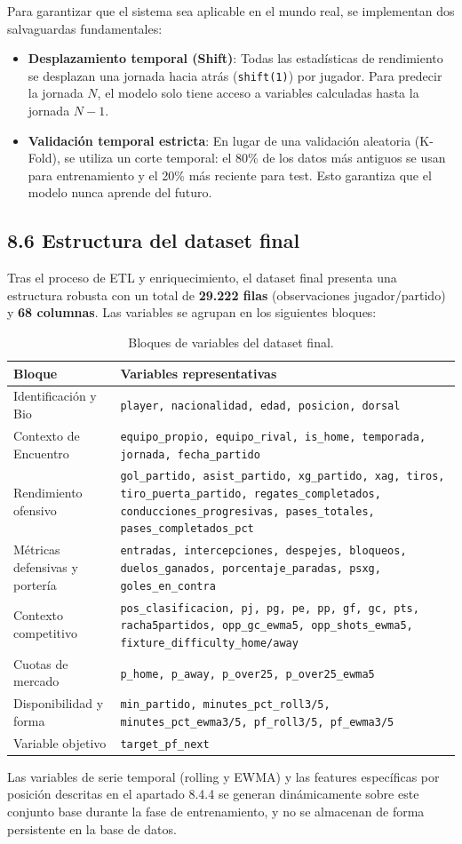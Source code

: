 Para garantizar que el sistema sea aplicable en el mundo real, se implementan dos
salvaguardas fundamentales:
 
\begin{itemize}
    \item \textbf{Desplazamiento temporal (Shift)}: Todas las estadísticas de rendimiento
    se desplazan una jornada hacia atrás (\texttt{shift(1)}) por jugador. Para predecir
    la jornada $N$, el modelo solo tiene acceso a variables calculadas hasta la jornada
    $N-1$.
 
    \item \textbf{Validación temporal estricta}: En lugar de una validación aleatoria
    (K-Fold), se utiliza un corte temporal: el 80\% de los datos más antiguos se usan
    para entrenamiento y el 20\% más reciente para test. Esto garantiza que el modelo
    nunca aprende del futuro.
\end{itemize}
 
\subsection{8.6 Estructura del dataset final}
 
Tras el proceso de ETL y enriquecimiento, el dataset final presenta una estructura robusta
con un total de \textbf{29.222 filas} (observaciones jugador/partido) y \textbf{68 columnas}.
Las variables se agrupan en los siguientes bloques:
 
\begin{table}[H]
\centering
\renewcommand{\arraystretch}{1.3}
\begin{tabular}{|p{4.5cm}|p{9cm}|}
\hline
\textbf{Bloque} & \textbf{Variables representativas} \\
\hline
Identificación y Bio &
\texttt{player, nacionalidad, edad, posicion, dorsal} \\
\hline
Contexto de Encuentro &
\texttt{equipo\_propio, equipo\_rival, is\_home, temporada, jornada, fecha\_partido} \\
\hline
Rendimiento ofensivo &
\texttt{gol\_partido, asist\_partido, xg\_partido, xag, tiros, tiro\_puerta\_partido,
regates\_completados, conducciones\_progresivas, pases\_totales,
pases\_completados\_pct} \\
\hline
Métricas defensivas y portería &
\texttt{entradas, intercepciones, despejes, bloqueos, duelos\_ganados,
porcentaje\_paradas, psxg, goles\_en\_contra} \\
\hline
Contexto competitivo &
\texttt{pos\_clasificacion, pj, pg, pe, pp, gf, gc, pts, racha5partidos,
opp\_gc\_ewma5, opp\_shots\_ewma5, fixture\_difficulty\_home/away} \\
\hline
Cuotas de mercado &
\texttt{p\_home, p\_away, p\_over25, p\_over25\_ewma5} \\
\hline
Disponibilidad y forma &
\texttt{min\_partido, minutes\_pct\_roll3/5, minutes\_pct\_ewma3/5,
pf\_roll3/5, pf\_ewma3/5} \\
\hline
Variable objetivo &
\texttt{target\_pf\_next} \\
\hline
\end{tabular}
\caption{Bloques de variables del dataset final.}
\label{tab:dataset-estructura}
\end{table}
 
\noindent Las variables de serie temporal (rolling y EWMA) y las features específicas por posición
descritas en el apartado 8.4.4 se generan dinámicamente sobre este conjunto base durante
la fase de entrenamiento, y no se almacenan de forma persistente en la base de datos.
